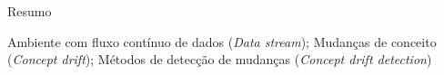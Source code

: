 \documentclass[qual, classic, a4paper]{ufbathesis}
\begin{document}

\vspace{1cm}

Resumo


\begin{keywords}
    Ambiente com fluxo contínuo de dados (\textit{Data stream}); Mudanças de conceito (\textit{Concept drift}); Métodos de detecção de mudanças (\textit{Concept drift detection})
\end{keywords}

%


\tableofcontents

\listoffigures
\end{document}
